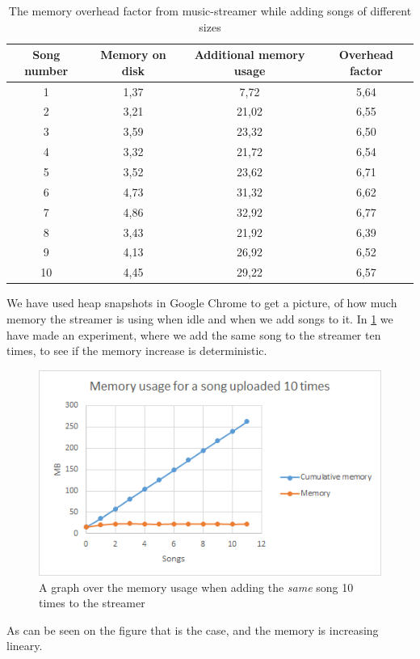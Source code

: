 \begin{table}[]
\centering
\begin{tabular}{|c|c|c|c|} \hline
Song number & Memory on disk & Additional memory usage & Overhead factor \\ \hline
1  & 1,37 & 7,72  & 5,64 \\
2  & 3,21 & 21,02 & 6,55 \\
3  & 3,59 & 23,32 & 6,50 \\
4  & 3,32 & 21,72 & 6,54 \\
5  & 3,52 & 23,62 & 6,71 \\
6  & 4,73 & 31,32 & 6,62 \\
7  & 4,86 & 32,92 & 6,77 \\
8  & 3,43 & 21,92 & 6,39 \\
9  & 4,13 & 26,92 & 6,52 \\
10 & 4,45 & 29,22 & 6,57 \\ \hline
\end{tabular}
\caption{The memory overhead factor from music-streamer while adding songs of different sizes}
\label{tab_memUsage}
\end{table}		
\noindent
We have used heap snapshots in Google Chrome to get a picture,
of how much memory the streamer is using when idle and when we add songs to it. 
In \ref{fig:memoryUsage} we have made an experiment,
where we add the same song to the streamer ten times,
to see if the memory increase is deterministic.

\begin{figure}[H]
	\centering
	\includegraphics[scale=0.9]{gfx/memoryUsage}
    \caption{A graph over the memory usage when adding the {\em same} song 10 times to the streamer}
	\label{fig:memoryUsage}
\end{figure}
\noindent
As can be seen on the figure that is the case, and the memory is increasing lineary.

